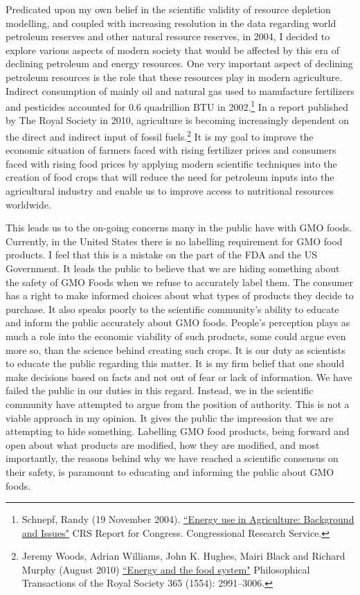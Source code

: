 \documentclass[letterpaper,10pt,twoside]{article}
\begin{document}
Predicated upon my own belief in the scientific validity of resource depletion modelling, and coupled with increasing resolution in the data regarding world petroleum reserves and other natural resource reserves, in 2004, I decided to explore various aspects of modern society that would be affected by this era of declining petroleum and energy resources.  One very important aspect of declining petroleum resources is the role that these resources play in modern agriculture.  Indirect consumption of mainly oil and natural gas used to manufacture fertilizers and pesticides accounted for 0.6 quadrillion BTU in 2002.\footnote{\label{Schnepf}Schnepf, Randy (19 November 2004). \href{http://www.nationalaglawcenter.org/wp-content/uploads/assets/crs/RL32677.pdf}{``Energy use in Agriculture: Background and Issues"} CRS Report for Congress. Congressional Research Service.}  In a report published by The Royal Society in 2010, agriculture is becoming increasingly dependent on the direct and indirect input of fossil fuels.\footnote{Jeremy Woods, Adrian Williams, John K. Hughes, Mairi Black and Richard Murphy (August 2010) \href{http://rstb.royalsocietypublishing.org/content/365/1554/2991.full}{``Energy and the food system"} Philosophical Transactions of the Royal Society 365 (1554): 2991–3006.}  It is my goal to improve the economic situation of farmers faced with rising fertilizer prices and consumers faced with rising food prices by applying modern scientific techniques into the creation of food crops that will reduce the need for petroleum inputs into the agricultural industry and enable us to improve access to nutritional resources worldwide.

This leads us to the on-going concerns many in the public have with GMO foods.  Currently, in the United States there is no labelling requirement for GMO food products.  I feel that this is a mistake on the part of the FDA and the US Government.  It leads the public to believe that we are hiding something about the safety of GMO Foods when we refuse to accurately label them.  The consumer has a right to make informed choices about what types of products they decide to purchase.  It also speaks poorly to the scientific community's ability to educate and inform the public accurately about GMO foods.  People's perception plays as much a role into the economic viability of such products, some could argue even more so, than the science behind creating such crops.  It is our duty as scientists to educate the public regarding this matter.  It is my firm belief that one should make decisions based on facts and not out of fear or lack of information.  We have failed the public in our duties in this regard.  Instead, we in the scientific community have attempted to argue from the position of authority.  This is not a viable approach in my opinion.  It gives the public the impression that we are attempting to hide something.  Labelling GMO food products, being forward and open about what products are modified, how they are modified, and most importantly, the reasons behind why we have reached a scientific consensus on their safety, is paramount to educating and informing the public about GMO foods.
\end{document}
